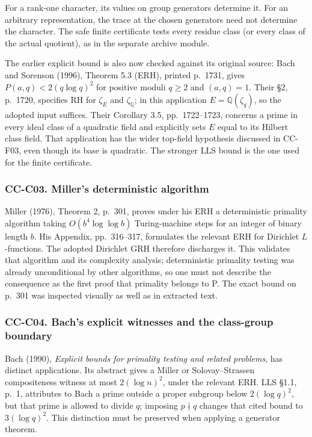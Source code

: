 \documentclass[11pt,a4paper]{article}
\theoremstyle{definition}\newtheorem{definition}[theorem]{Definition}
\theoremstyle{remark}\newtheorem{remark}[theorem]{Remark}
\begin{document}
For a rank-one character, its values on group generators determine it.
For an arbitrary representation, the trace at the chosen generators need
not determine the character. The safe finite certificate tests every
residue class (or every class of the actual quotient), as in the
separate archive module.

The earlier explicit bound is also now checked against its original
source: Bach and Sorenson (1996), Theorem 5.3 (ERH), printed p.~1731,
gives \(P(a,q)<2(q\log q)^2\) for positive moduli \(q\ge2\) and
\((a,q)=1\). Their §2, p.~1720, specifies RH for \(\zeta_E\) and
\(\zeta_{\mathbb Q}\); in this application \(E=\mathbb Q(\zeta_q)\), so
the adopted input suffices. Their Corollary 3.5, pp.~1722--1723,
concerns a prime in every ideal class of a quadratic field and
explicitly sets \(E\) equal to its Hilbert class field. That application
has the wider top-field hypothesis discussed in CC-F03, even though its
base is quadratic. The stronger LLS bound is the one used for the finite
certificate.

\subsubsection{CC-C03. Miller's deterministic
algorithm}\label{cc-c03.-millers-deterministic-algorithm}

Miller (1976), Theorem 2, p.~301, proves under his ERH a deterministic
primality algorithm taking \(O(b^4\log\log b)\) Turing-machine steps for
an integer of binary length \(b\). His Appendix, pp.~316--317,
formulates the relevant ERH for Dirichlet \(L\)-functions. The adopted
Dirichlet GRH therefore discharges it. This validates that algorithm and
its complexity analysis; deterministic primality testing was already
unconditional by other algorithms, so one must not describe the
consequence as the first proof that primality belongs to P. The exact
bound on p.~301 was inspected visually as well as in extracted text.

\subsubsection{CC-C04. Bach's explicit witnesses and the class-group
boundary}\label{cc-c04.-bachs-explicit-witnesses-and-the-class-group-boundary}

Bach (1990), \emph{Explicit bounds for primality testing and related
problems}, has distinct applications. Its abstract gives a Miller or
Solovay--Strassen compositeness witness at most \(2(\log n)^2\), under
the relevant ERH. LLS §1.1, p.~1, attributes to Bach a prime outside a
proper subgroup below \(2(\log q)^2\), but that prime is allowed to
divide \(q\); imposing \(p\nmid q\) changes that cited bound to
\(3(\log q)^2\). This distinction must be preserved when applying a
generator theorem.
\end{document}
